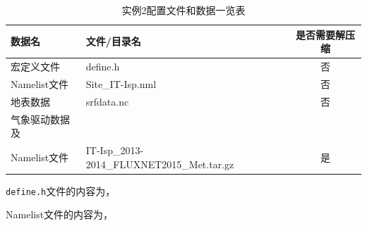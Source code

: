 \begin{table}[htbp]
\caption{实例2配置文件和数据一览表}
\centering \renewcommand{\arraystretch}{1.5}
\label{ex2table}
\begin{tabular}{llc}
\toprule
\textbf{数据名} & \textbf{文件/目录名} & \textbf{是否需要解压缩} \\

\midrule

宏定义文件 & define.h & 否 \\
Namelist文件 & Site\_IT-Isp.nml & 否 \\
地表数据 & srfdata.nc & 否 \\
气象驱动数据及\\Namelist文件 & IT-Isp\_2013-2014\_FLUXNET2015\_Met.tar.gz & 是 \\

\bottomrule
\end{tabular}
\end{table}

\texttt{define.h}文件的内容为，


Namelist文件的内容为，


